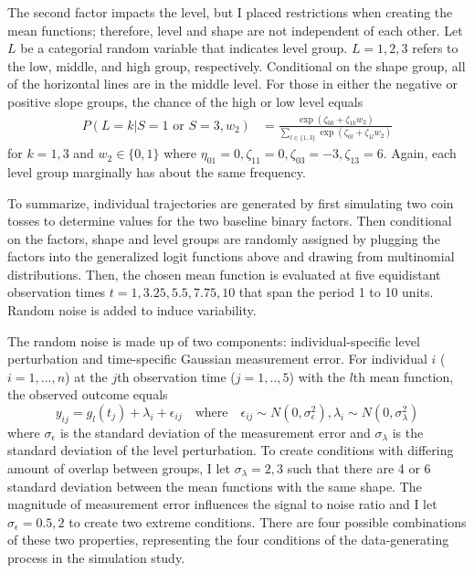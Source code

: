 \documentclass[12pt]{article}
\begin{document}
The second factor impacts the level, but I placed restrictions when creating the mean functions; therefore, level and shape are not independent of each other. Let $L$ be a categorial random variable that indicates level group. $L=1,2,3$ refers to the low, middle, and high group, respectively. Conditional on the shape group, all of the horizontal lines are in the middle level. For those in either the negative or positive slope groups, the chance of the high or low level equals
\begin{align*}
P(L=k|S=1 \text{ or } S=3,w_{2}) & = \frac{\exp(\zeta_{0k}+\zeta_{1k} w_{2})}{\sum_{l\in\{1,3\} }\exp(\zeta_{0l}+\zeta_{1l}w_{2})}
\end{align*}
for $k=1,3$ and $w_{2}\in\{0,1\}$ where $\eta_{01}=0,\zeta_{11}=0,\zeta_{03}=-3,\zeta_{13}=6$. Again, each level group marginally has about the same frequency.

To summarize, individual trajectories are generated by first simulating two coin tosses to determine values for the two baseline binary factors. Then conditional on the factors, shape and level groups are randomly assigned by plugging the factors into the generalized logit functions above and drawing from multinomial distributions. Then, the chosen mean function is evaluated at five equidistant observation times $t=1,3.25,5.5,7.75,10$ that span the period 1 to 10 units. Random noise is added to induce variability. 

The random noise is made up of two components: individual-specific level perturbation and time-specific Gaussian measurement error. For individual $i$ ($i=1,...,n$) at the $j$th observation time ($j=1,..,5$) with the $l$th mean function, the observed outcome equals
$$y_{ij} = g_{l}(t_{j})+\lambda_{i}+\epsilon_{ij}\quad\text{where}\quad \epsilon_{ij}\sim N(0,\sigma_{\epsilon}^{2}), \lambda_{i}\sim N(0,\sigma_{\lambda}^{2})$$
where $\sigma_{\epsilon}$  is the standard deviation of the measurement error and $\sigma_{\lambda}$ is the standard deviation of the level perturbation. To create conditions with differing amount of overlap between groups, I let $\sigma_{\lambda}=2,3$ such that there are 4 or 6 standard deviation between the mean functions with the same shape. The magnitude of measurement error influences the signal to noise ratio and I let $\sigma_{\epsilon}=0.5, 2$ to create two extreme conditions. There are four possible combinations of these two properties, representing the four  conditions of the data-generating process in the simulation study. 
\end{document}
